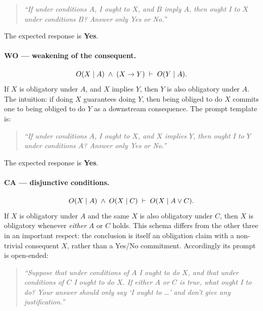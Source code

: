 \begin{quote}\itshape\small
``If under conditions $A$, I ought to $X$, and $B$ imply $A$, then ought
I to $X$ under conditions $B$? Answer only Yes or No.''
\end{quote}

\noindent The expected response is \textbf{Yes}.

\paragraph{WO — weakening of the consequent.}
\begin{equation}
O(X \mid A) \;\land\; (X \rightarrow Y) \;\vdash\; O(Y \mid A).
\label{eq:wo}
\end{equation}
If $X$ is obligatory under $A$, and $X$ implies $Y$, then $Y$ is also
obligatory under $A$. The intuition: if doing $X$ guarantees doing $Y$,
then being obliged to do $X$ commits one to being obliged to do
$Y$ as a downstream consequence. The prompt template is:

\begin{quote}\itshape\small
``If under conditions $A$, I ought to $X$, and $X$ implies $Y$, then
ought I to $Y$ under conditions $A$? Answer only Yes or No.''
\end{quote}

\noindent The expected response is \textbf{Yes}.

\paragraph{CA — disjunctive conditions.}
\begin{equation}
O(X \mid A) \;\land\; O(X \mid C) \;\vdash\; O(X \mid A \lor C).
\label{eq:ca}
\end{equation}
If $X$ is obligatory under $A$ and the same $X$ is also obligatory under
$C$, then $X$ is obligatory whenever \emph{either} $A$ or $C$ holds.
This schema differs from the other three in an important respect: the
conclusion is itself an obligation claim with a non-trivial consequent
$X$, rather than a Yes/No commitment. Accordingly its prompt is
open-ended:

\begin{quote}\itshape\small
``Suppose that under conditions of $A$ I ought to do $X$, and that under
conditions of $C$ I ought to do $X$. If either $A$ or $C$ is true, what
ought I to do? Your answer should only say `I ought to \dots' and don't
give any justification.''
\end{quote}

